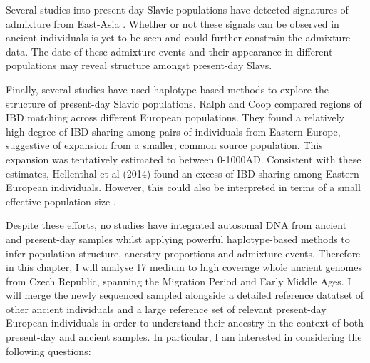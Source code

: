 Several studies into present-day Slavic populations have detected signatures of admixture from East-Asia \cite{Hellenthal2014, pankratov2016east, MOSAIC_2019, maliarchuk2008origin, qin2015quantitating}. Whether or not these signals can be observed in ancient individuals is yet to be seen and could further constrain the admixture data. The date of these admixture events and their appearance in different populations may reveal structure amongst present-day Slavs. 

Finally, several studies have used haplotype-based methods to explore the structure of present-day Slavic populations. Ralph and Coop \cite{RalphCoop2013} compared regions of IBD matching  across different European populations. They found a relatively high degree of IBD sharing among pairs of individuals from Eastern Europe, suggestive of expansion from a smaller, common source population. This expansion was tentatively estimated to between 0-1000AD. Consistent with these estimates, Hellenthal et al (2014) \cite{Hellenthal2014} found an excess of IBD-sharing among Eastern European individuals. However, this could also be interpreted in terms of a small effective population size \cite{al2019estimating, ringbauer2017inferring}. 

Despite these efforts, no studies have integrated autosomal DNA from ancient and present-day samples whilst applying powerful haplotype-based methods to infer population structure, ancestry proportions and admixture events. Therefore in this chapter, I will analyse 17 medium to high coverage whole ancient genomes from Czech Republic, spanning the Migration Period and Early Middle Ages. I will merge the newly sequenced sampled alongside a detailed reference datatset of other ancient individuals and a large reference set of relevant present-day European individuals in order to understand their ancestry in the context of both present-day and ancient samples. In particular, I am interested in considering the following questions:

